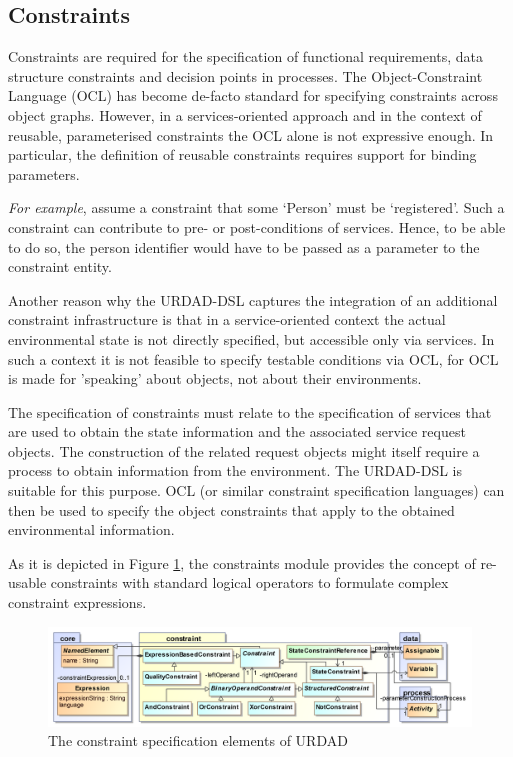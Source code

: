 \subsection{Constraints}

Constraints are required for the specification of functional requirements, data structure constraints and decision points in processes. 
The Object-Constraint Language (OCL) has become de-facto standard for specifying constraints across object graphs. However, in a services-oriented approach and in the context of reusable, parameterised constraints the OCL alone is not expressive enough. In particular, the definition of reusable constraints requires support for binding parameters. 

\emph{For example}, assume a constraint that some `Person' must be `registered'. Such a constraint can contribute to pre- or post-conditions of services. Hence, to be able to do so, the person identifier would have to be passed as a parameter to the constraint entity.

Another reason why the URDAD-DSL captures the integration of an additional constraint infrastructure is that in a service-oriented context the actual environmental state is not directly specified, but accessible only via services. In such a context it is not feasible to specify testable conditions via OCL, for OCL is made for 'speaking' about objects, not about their environments.

The specification of constraints must relate to the specification of services that are used to obtain the state information and the associated service request objects. The construction of the related request objects might itself require a process to obtain information from the environment. The URDAD-DSL is suitable for this purpose. OCL (or similar constraint specification languages) can then be used to specify the object constraints that apply to the obtained environmental information.

As it is depicted in Figure \ref{fig:constraintModule}, the constraints module provides the concept of re-usable constraints with standard logical operators to formulate complex constraint expressions.
\begin{figure}[Htbp]
  \centering
  \includegraphics{constraint}
  \caption{The constraint specification elements of URDAD}
  \label{fig:constraintModule}
\end{figure}

